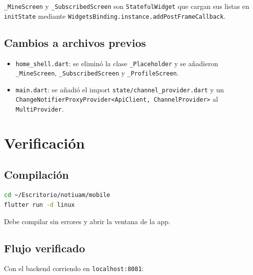 \texttt{\_MineScreen} y \texttt{\_SubscribedScreen} son \texttt{StatefulWidget} que cargan sus listas en \texttt{initState} mediante \texttt{WidgetsBinding.instance.addPostFrameCallback}.

\subsection{Cambios a archivos previos}

\begin{itemize}[leftmargin=*]
  \item \texttt{home\_shell.dart}: se eliminó la clase \texttt{\_Placeholder} y se añadieron \texttt{\_MineScreen}, \texttt{\_SubscribedScreen} y \texttt{\_ProfileScreen}.
  \item \texttt{main.dart}: se añadió el import \texttt{state/channel\_provider.dart} y un \texttt{ChangeNotifierProxyProvider<ApiClient, ChannelProvider>} al \texttt{MultiProvider}.
\end{itemize}

\section{Verificación}

\subsection{Compilación}

\begin{lstlisting}[language=bash]
cd ~/Escritorio/notiuam/mobile
flutter run -d linux
\end{lstlisting}

Debe compilar sin errores y abrir la ventana de la app.

\subsection{Flujo verificado}

Con el backend corriendo en \texttt{localhost:8081}:

